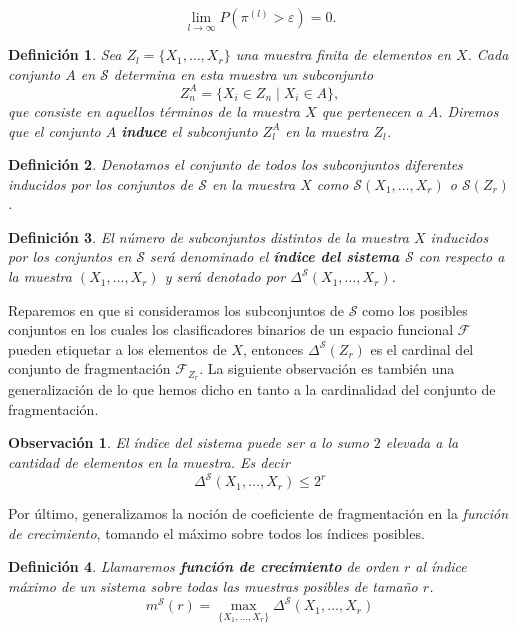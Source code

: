 \documentclass{article}
\newtheorem{dfn}{Definición}[subsection]
\newtheorem{obs}{Observación}[subsection]
\begin{document}
\[
\lim_{l \to \infty} P\left(\pi^{(l)} > \varepsilon\right) = 0.
\]



\begin{dfn}
Sea \( Z_l = \{X_1, \dots, X_r\} \) una muestra finita de elementos en \( X \). 
Cada conjunto \( A \) en \( \mathcal{S} \) determina en esta muestra un subconjunto 
\[ 
    Z_n^A = \{X_i \in Z_n \mid X_i \in A\}, 
\]
que consiste en aquellos términos de la 
muestra \( X \) que pertenecen a \( A \). Diremos que el conjunto \( A \) \textbf{induce} 
el subconjunto \( Z_l^A  \) en la muestra \( Z_l \).
\end{dfn}


\begin{dfn}
Denotamos el conjunto de todos los subconjuntos diferentes inducidos por los 
conjuntos de \( \mathcal{S} \) en la muestra \( X \) como \( \mathcal{S}(X_1, \dots, X_r) \) 
o \( \mathcal{S}(Z_r) \).
\end{dfn}

\begin{dfn}
El número de subconjuntos distintos de la muestra \( X \) 
inducidos por los conjuntos en \( \mathcal{S} \) será denominado el \textbf{índice 
del sistema \( \mathcal{S} \)} con respecto a la muestra \( (X_1, \dots, X_r) \) 
y será denotado por \(\Delta^{\mathcal{S}}(X_1, \dots, X_r) \).
\end{dfn}

Reparemos en que si consideramos los subconjuntos de $\mathcal{S}$ como los posibles conjuntos en
los cuales los clasificadores binarios de un espacio funcional $\mathcal{F}$ pueden etiquetar a los
elementos de $X$, entonces $\Delta^{\mathcal{S}}(Z_r)$ es el cardinal del conjunto de fragmentación $\mathcal{F}_{Z_r}$.
La siguiente observación es también una generalización
de lo que hemos dicho en tanto a la cardinalidad del conjunto de fragmentación.\newline


\begin{obs} El índice del sistema puede ser a lo sumo $2$ elevada a la cantidad de elementos en la muestra. Es decir
\[
    \Delta^{\mathcal{S}}(X_1, \dots, X_r) \leq 2^r
\]
\end{obs}

Por último, generalizamos la noción de coeficiente de fragmentación en la \textit{función de crecimiento},
tomando el máximo sobre todos los índices posibles.\newline

\begin{dfn}
    Llamaremos \textbf{función de crecimiento} de orden $r$ al índice máximo de un sistema sobre todas las muestras
    posibles de tamaño $r$. 
    \[
    m^{\mathcal{S}}(r) = \max_{\{X_1,\dots,X_r\}}\Delta^{\mathcal{S}}(X_1,\dots,X_r)
    \]
\end{dfn}
\end{document}
